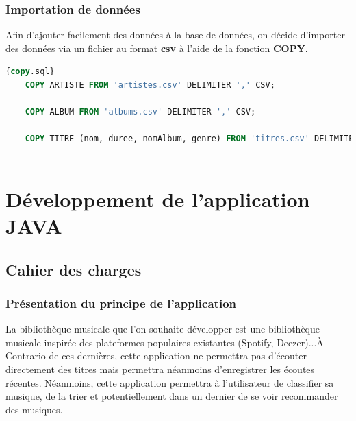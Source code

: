 \documentclass[a4paper,12pt, french]{report}
\begin{document}
\subsection{Importation de données}
Afin d'ajouter facilement des données à la base de données, on décide d'importer des données via un fichier au format \textbf{csv} à l'aide de la fonction \textbf{COPY}.
	\begin{lstlisting}[language=SQL, label=data-coy,caption=Copie des données, breaklines, frame=single]{copy.sql}
	COPY ARTISTE FROM 'artistes.csv' DELIMITER ',' CSV;
	
	COPY ALBUM FROM 'albums.csv' DELIMITER ',' CSV;
	
	COPY TITRE (nom, duree, nomAlbum, genre) FROM 'titres.csv' DELIMITER ',' CSV;
	
     \end{lstlisting}


\chapter{Développement de l'application JAVA}
\section{Cahier des charges}
  \subsection{Présentation du principe de l'application}
    La bibliothèque musicale que l'on souhaite développer est une bibliothèque musicale inspirée des plateformes populaires existantes (Spotify, Deezer)...À Contrario de ces dernières, cette application ne permettra pas d'écouter directement des titres mais permettra néanmoins d'enregistrer les écoutes récentes. Néanmoins, cette application permettra à l'utilisateur de classifier sa musique, de la trier et potentiellement dans un dernier de se voir recommander des musiques.
\end{document}
